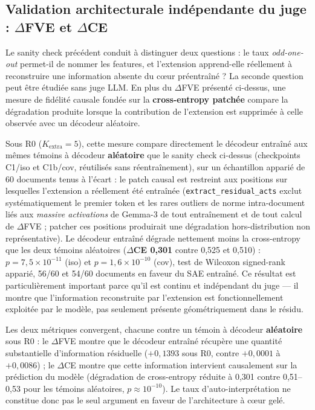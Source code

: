 \documentclass[11pt]{article}
\begin{document}
\subsection{Validation architecturale indépendante du juge : $\Delta$FVE et $\Delta$CE}
\label{subsec:delta-ce}

Le sanity check précédent conduit à distinguer deux questions : le taux
\emph{odd-one-out} permet-il de nommer les features, et l'extension apprend-elle
réellement à reconstruire une information absente du cœur préentraîné ? La seconde
question peut être étudiée sans juge LLM. En plus du $\Delta$FVE présenté ci-dessus,
une mesure de fidélité causale fondée sur la \textbf{cross-entropy patchée} compare la
dégradation produite lorsque la contribution de l'extension est supprimée à celle
observée avec un décodeur aléatoire.

Sous R0 ($K_\text{extra}=5$), cette mesure compare directement le décodeur entraîné aux
mêmes témoins à décodeur \textbf{aléatoire} que le sanity check ci-dessus (checkpoints
C1/iso et C1b/cov, réutilisés sans réentraînement), sur un échantillon apparié de 60
documents tenus à l'écart : le patch causal est restreint aux positions sur lesquelles
l'extension a réellement été entraînée (\texttt{extract\_residual\_acts} exclut
systématiquement le premier token et les rares outliers de norme intra-document liés aux
\emph{massive activations} de Gemma-3 de tout entraînement et de tout calcul de
$\Delta$FVE ; patcher ces positions produirait une dégradation hors-distribution non
représentative). Le décodeur entraîné dégrade nettement moins la cross-entropy que les
deux témoins aléatoires (\textbf{$\Delta$CE 0,301} contre 0,525 et 0,510) :
$p=7{,}5\times10^{-11}$ (iso) et $p=1{,}6\times10^{-10}$ (cov), test de Wilcoxon
signed-rank apparié, 56/60 et 54/60 documents en faveur du SAE entraîné. Ce résultat est
particulièrement important parce qu'il est continu et indépendant du juge --- il montre
que l'information reconstruite par l'extension est fonctionnellement exploitée par le
modèle, pas seulement présente géométriquement dans le résidu.

\begin{resultbox}
Les deux métriques convergent, chacune contre un témoin à décodeur \textbf{aléatoire} sous
R0 : le $\Delta$FVE montre que le décodeur entraîné récupère une quantité substantielle
d'information résiduelle ($+0{,}1393$ sous R0, contre $+0{,}0001$ à $+0{,}0086$) ; le
$\Delta$CE montre que cette information intervient causalement sur la prédiction du modèle
(dégradation de cross-entropy réduite à 0,301 contre 0,51--0,53 pour les témoins aléatoires,
$p\approx10^{-10}$). Le taux d'auto-interprétation ne constitue donc pas le seul argument en
faveur de l'architecture à cœur gelé.
\end{resultbox}
\end{document}
